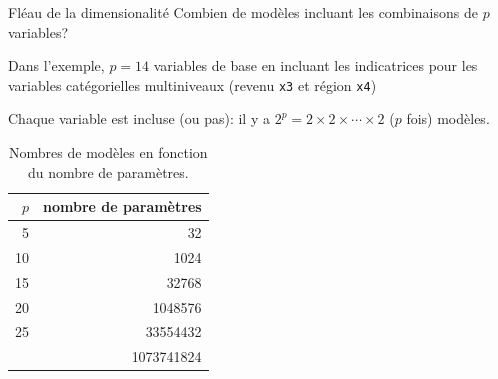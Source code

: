 \documentclass[
  ignorenonframetext,
]{beamer}
\begin{document}
\begin{frame}[fragile]{Fléau de la dimensionalité}
\protect\hypertarget{fluxe9au-de-la-dimensionalituxe9}{}
Combien de modèles incluant les combinaisons de \(p\) variables?

Dans l'exemple, \(p=14\) variables de base en incluant les indicatrices
pour les variables catégorielles multiniveaux (revenu \texttt{x3} et
région \texttt{x4})

Chaque variable est incluse (ou pas): il y a
\(2^p=2\times 2 \times \cdots \times 2\) (\(p\) fois) modèles.

\hypertarget{tbl-02-table3}{}
\begin{table}
\caption{\label{tbl-02-table3}Nombres de modèles en fonction du nombre de paramètres. }\tabularnewline

\centering
\begin{tabular}{rr}
\toprule
$p$ & nombre de paramètres\\
\midrule
5 & 32\\
10 & 1024\\
15 & 32768\\
20 & 1048576\\
25 & 33554432\\
\addlinespace
30 & 1073741824\\
\bottomrule
\end{tabular}
\end{table}
\end{frame}
\end{document}
